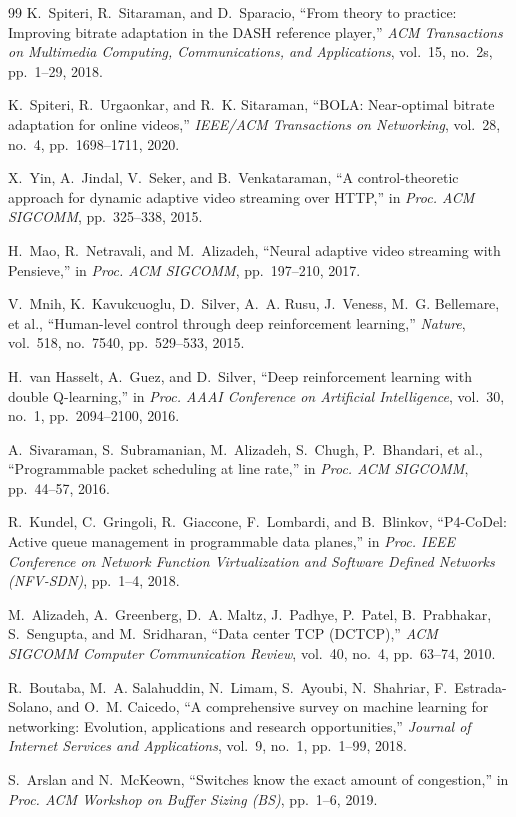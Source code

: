 \documentclass[12pt,a4paper,oneside]{report}
\begin{document}
\begin{thebibliography}{99}
K.~Spiteri, R.~Sitaraman, and D.~Sparacio, ``From theory to practice: Improving bitrate adaptation in the DASH reference player,'' \emph{ACM Transactions on Multimedia Computing, Communications, and Applications}, vol.~15, no.~2s, pp.~1--29, 2018.

K.~Spiteri, R.~Urgaonkar, and R.~K. Sitaraman, ``BOLA: Near-optimal bitrate adaptation for online videos,'' \emph{IEEE/ACM Transactions on Networking}, vol.~28, no.~4, pp.~1698--1711, 2020.

X.~Yin, A.~Jindal, V.~Seker, and B.~Venkataraman, ``A control-theoretic approach for dynamic adaptive video streaming over HTTP,'' in \emph{Proc. ACM SIGCOMM}, pp.~325--338, 2015.

H.~Mao, R.~Netravali, and M.~Alizadeh, ``Neural adaptive video streaming with Pensieve,'' in \emph{Proc. ACM SIGCOMM}, pp.~197--210, 2017.

V.~Mnih, K.~Kavukcuoglu, D.~Silver, A.~A. Rusu, J.~Veness, M.~G. Bellemare, et al., ``Human-level control through deep reinforcement learning,'' \emph{Nature}, vol.~518, no.~7540, pp.~529--533, 2015.

H.~van Hasselt, A.~Guez, and D.~Silver, ``Deep reinforcement learning with double Q-learning,'' in \emph{Proc. AAAI Conference on Artificial Intelligence}, vol.~30, no.~1, pp.~2094--2100, 2016.

A.~Sivaraman, S.~Subramanian, M.~Alizadeh, S.~Chugh, P.~Bhandari, et al., ``Programmable packet scheduling at line rate,'' in \emph{Proc. ACM SIGCOMM}, pp.~44--57, 2016.

R.~Kundel, C.~Gringoli, R.~Giaccone, F.~Lombardi, and B.~Blinkov, ``P4-CoDel: Active queue management in programmable data planes,'' in \emph{Proc. IEEE Conference on Network Function Virtualization and Software Defined Networks (NFV-SDN)}, pp.~1--4, 2018.

M.~Alizadeh, A.~Greenberg, D.~A. Maltz, J.~Padhye, P.~Patel, B.~Prabhakar, S.~Sengupta, and M.~Sridharan, ``Data center TCP (DCTCP),'' \emph{ACM SIGCOMM Computer Communication Review}, vol.~40, no.~4, pp.~63--74, 2010.

R.~Boutaba, M.~A. Salahuddin, N.~Limam, S.~Ayoubi, N.~Shahriar, F.~Estrada-Solano, and O.~M. Caicedo, ``A comprehensive survey on machine learning for networking: Evolution, applications and research opportunities,'' \emph{Journal of Internet Services and Applications}, vol.~9, no.~1, pp.~1--99, 2018.

S.~Arslan and N.~McKeown, ``Switches know the exact amount of congestion,'' in \emph{Proc. ACM Workshop on Buffer Sizing (BS)}, pp.~1--6, 2019.

\end{thebibliography}
\end{document}
